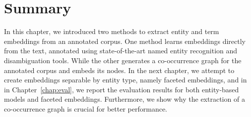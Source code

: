 \section{Summary}\label{sec:entity_summary}
In this chapter, we introduced two methods to extract entity and term embeddings from an annotated corpus. One method learns embeddings directly from the text, annotated using state-of-the-art named entity recognition and disambiguation tools. While the other generates a co-occurrence graph for the annotated corpus and embeds its nodes. In the next chapter, we attempt to create embeddings separable by entity type, namely faceted embeddings, and in in Chapter~\ref{chap:eval}, we report the evaluation results for both entity-based models and faceted embeddings. Furthermore, we show why the extraction of a co-occurrence graph is crucial for better performance. 
